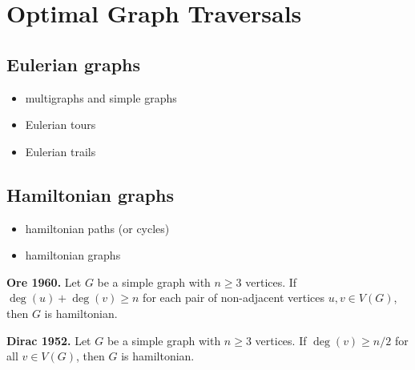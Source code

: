 
\chapter{Optimal Graph Traversals}
\label{chap:optimal_traversals}



\section{Eulerian graphs}

\begin{itemize}
\item multigraphs and simple graphs

\item Eulerian tours

\item Eulerian trails
\end{itemize}



\section{Hamiltonian graphs}

\begin{itemize}
\item hamiltonian paths (or cycles)

\item hamiltonian graphs
\end{itemize}

\begin{theorem}
\textbf{Ore 1960.}
Let $G$ be a simple graph with $n \geq 3$ vertices. If
$\deg(u) + \deg(v) \geq n$ for each pair of non-adjacent vertices
$u, v \in V(G)$, then $G$ is hamiltonian.
\end{theorem}

\begin{corollary}
\textbf{Dirac 1952.}
Let $G$ be a simple graph with $n \geq 3$ vertices. If
$\deg(v) \geq n / 2$ for all $v \in V(G)$, then $G$ is hamiltonian.
\end{corollary}


